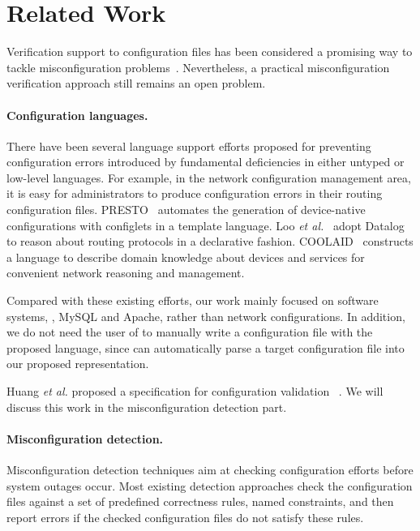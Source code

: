 
\section{Related Work}

Verification support to configuration files 
has been considered a promising way  
to tackle misconfiguration problems~\cite{xu15systems}.
Nevertheless, a practical misconfiguration
verification approach still remains an open problem.

\paragraph{Configuration languages.}
There have been several language support efforts proposed for preventing
configuration errors introduced by fundamental deficiencies in
either untyped or low-level languages. For example, in the network
configuration management area, it is easy for administrators to
produce configuration errors in their routing configuration files.
PRESTO~\cite{enck07configuration} 
automates the generation of device-native configurations
with configlets in a template language. 
Loo {\em et al.}~\cite{loo05declarative} adopt Datalog to reason about 
routing protocols in a declarative fashion. 
COOLAID~\cite{chen10declarative} constructs
a language to describe domain knowledge about devices and
services for convenient network reasoning and management.

Compared with these existing efforts, 
our work mainly focused on software systems, \eg, MySQL and Apache,
rather than network configurations. In addition, we do not need 
the user of \app to manually write a configuration file with the proposed
language, since \app can automatically parse a target configuration
file into our proposed representation.

Huang {\em et al.} proposed a specification for configuration validation%
~\cite{huang15confvalley}. We will 
discuss this work in the misconfiguration
detection part.

\paragraph{Misconfiguration detection.}
Misconfiguration detection techniques aim at checking configuration
efforts before system outages occur.
Most existing detection approaches check 
the configuration files against a set of predefined correctness 
rules, named constraints, and then report errors if 
the checked configuration files do not satisfy these rules.


